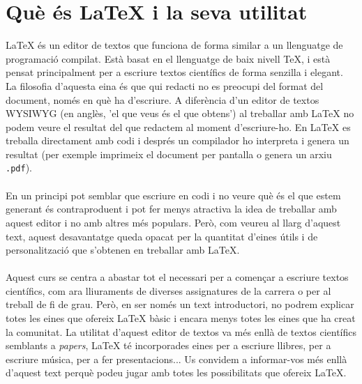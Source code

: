 \documentclass[15pt,twosides,onecolumn,openany]{book}
\begin{document}
\section{Què és LaTeX i la seva utilitat}
LaTeX és un editor de textos que funciona de forma similar a un llenguatge de programació compilat. Està basat en el llenguatge de baix nivell \TeX{}, i està pensat principalment per a escriure textos científics de forma senzilla i elegant. La filosofia d'aquesta eina és que qui redacti no es preocupi del format del document, només en què ha d'escriure. A diferència d'un editor de textos \textsc{WYSIWYG} (en anglès, 'el que veus és el que obtens') al treballar amb LaTeX no podem veure el resultat del que redactem al moment d'escriure-ho. En LaTeX es treballa directament amb codi i després un compilador ho interpreta i genera un resultat (per exemple imprimeix el document per pantalla o genera un arxiu \texttt{.pdf}).\\\\
En un principi pot semblar que escriure en codi i no veure què és el que estem generant és contraproduent i pot fer menys atractiva la idea de treballar amb aquest editor i no amb altres més populars. Però, com veureu al llarg d'aquest text, aquest desavantatge queda opacat per la quantitat d'eines útils i de personalització que s'obtenen en treballar amb LaTeX.\\\\
Aquest curs se centra a abastar tot el necessari per a començar a escriure textos científics, com ara lliuraments de diverses assignatures de la carrera o per al treball de fi de grau. Però, en ser només un text introductori, no podrem explicar totes les eines que ofereix LaTeX bàsic i encara menys totes les eines que ha creat la comunitat. La utilitat d'aquest editor de textos va més enllà de textos científics semblants a \textit{papers}, LaTeX té incorporades eines per a escriure llibres, per a escriure música, per a fer presentacions... Us convidem a informar-vos més enllà d'aquest text perquè podeu jugar amb totes les possibilitats que ofereix LaTeX.
\end{document}

